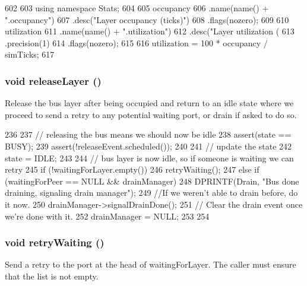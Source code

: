 \begin{DoxyCode}
602 {
603     using namespace Stats;
604 
605     occupancy
606         .name(name() + ".occupancy")
607         .desc("Layer occupancy (ticks)")
608         .flags(nozero);
609 
610     utilization
611         .name(name() + ".utilization")
612         .desc("Layer utilization (%
613         .precision(1)
614         .flags(nozero);
615 
616     utilization = 100 * occupancy / simTicks;
617 }
\end{DoxyCode}
\hypertarget{classBaseBus_1_1Layer_a8f18de03b5e7510ac8a47a698bd673e3}{
\subsubsection[{releaseLayer}]{\setlength{\rightskip}{0pt plus 5cm}void releaseLayer ()}}
\label{classBaseBus_1_1Layer_a8f18de03b5e7510ac8a47a698bd673e3}
Release the bus layer after being occupied and return to an idle state where we proceed to send a retry to any potential waiting port, or drain if asked to do so. 


\begin{DoxyCode}
236 {
237     // releasing the bus means we should now be idle
238     assert(state == BUSY);
239     assert(!releaseEvent.scheduled());
240 
241     // update the state
242     state = IDLE;
243 
244     // bus layer is now idle, so if someone is waiting we can retry
245     if (!waitingForLayer.empty()) {
246         retryWaiting();
247     } else if (waitingForPeer == NULL && drainManager) {
248         DPRINTF(Drain, "Bus done draining, signaling drain manager\n");
249         //If we weren't able to drain before, do it now.
250         drainManager->signalDrainDone();
251         // Clear the drain event once we're done with it.
252         drainManager = NULL;
253     }
254 }
\end{DoxyCode}
\hypertarget{classBaseBus_1_1Layer_ae589ae2847102aa65e86ebc70414fea3}{
\subsubsection[{retryWaiting}]{\setlength{\rightskip}{0pt plus 5cm}void retryWaiting ()}}
\label{classBaseBus_1_1Layer_ae589ae2847102aa65e86ebc70414fea3}
Send a retry to the port at the head of waitingForLayer. The caller must ensure that the list is not empty. 


